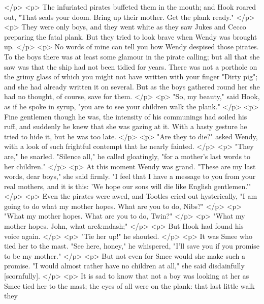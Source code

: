     </p>
    <p>
      The infuriated pirates buffeted them in the mouth; and Hook roared out,
      "That seals your doom. Bring up their mother. Get the plank ready."
    </p>
    <p>
      They were only boys, and they went white as they saw Jukes and Cecco
      preparing the fatal plank. But they tried to look brave when Wendy was
      brought up.
    </p>
    <p>
      No words of mine can tell you how Wendy despised those pirates. To the
      boys there was at least some glamour in the pirate calling; but all that
      she saw was that the ship had not been tidied for years. There was not a
      porthole on the grimy glass of which you might not have written with your
      finger "Dirty pig"; and she had already written it on several. But as the
      boys gathered round her she had no thought, of course, save for them.
    </p>
    <p>
      "So, my beauty," said Hook, as if he spoke in syrup, "you are to see your
      children walk the plank."
    </p>
    <p>
      Fine gentlemen though he was, the intensity of his communings had soiled
      his ruff, and suddenly he knew that she was gazing at it. With a hasty
      gesture he tried to hide it, but he was too late.
    </p>
    <p>
      "Are they to die?" asked Wendy, with a look of such frightful contempt
      that he nearly fainted.
    </p>
    <p>
      "They are," he snarled. "Silence all," he called gloatingly, "for a
      mother's last words to her children."
    </p>
    <p>
      At this moment Wendy was grand. "These are my last words, dear boys," she
      said firmly. "I feel that I have a message to you from your real mothers,
      and it is this: 'We hope our sons will die like English gentlemen.'"
    </p>
    <p>
      Even the pirates were awed, and Tootles cried out hysterically, "I am
      going to do what my mother hopes. What are you to do, Nibs?"
    </p>
    <p>
      "What my mother hopes. What are you to do, Twin?"
    </p>
    <p>
      "What my mother hopes. John, what are&mdash;"
    </p>
    <p>
      But Hook had found his voice again.
    </p>
    <p>
      "Tie her up!" he shouted.
    </p>
    <p>
      It was Smee who tied her to the mast. "See here, honey," he whispered,
      "I'll save you if you promise to be my mother."
    </p>
    <p>
      But not even for Smee would she make such a promise. "I would almost
      rather have no children at all," she said disdainfully [scornfully].
    </p>
    <p>
      It is sad to know that not a boy was looking at her as Smee tied her to
      the mast; the eyes of all were on the plank: that last little walk they
